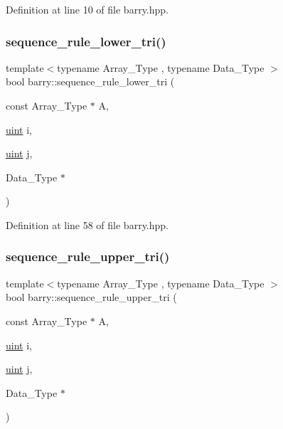 Definition at line 10 of file barry.\+hpp.

\mbox{\label{namespacebarry_a2889c6210e2711e33c34ca9c8b5de7d9}} 
\subsubsection{\texorpdfstring{sequence\+\_\+rule\+\_\+lower\+\_\+tri()}{sequence\_rule\_lower\_tri()}}
{\footnotesize\ttfamily template$<$typename Array\+\_\+\+Type , typename Data\+\_\+\+Type $>$ \\
bool barry\+::sequence\+\_\+rule\+\_\+lower\+\_\+tri (\begin{DoxyParamCaption}\item[{const Array\+\_\+\+Type $\ast$}]{A,  }\item[{\hyperlink{namespacebarry_a11dfc53ddb4672278319aa04f1e09a6c}{uint}}]{i,  }\item[{\hyperlink{namespacebarry_a11dfc53ddb4672278319aa04f1e09a6c}{uint}}]{j,  }\item[{Data\+\_\+\+Type $\ast$}]{ }\end{DoxyParamCaption})\hspace{0.3cm}{\ttfamily [inline]}}



Definition at line 58 of file barry.\+hpp.

\mbox{\label{namespacebarry_a1433970b34e5904f846a0aa41abef448}} 
\subsubsection{\texorpdfstring{sequence\+\_\+rule\+\_\+upper\+\_\+tri()}{sequence\_rule\_upper\_tri()}}
{\footnotesize\ttfamily template$<$typename Array\+\_\+\+Type , typename Data\+\_\+\+Type $>$ \\
bool barry\+::sequence\+\_\+rule\+\_\+upper\+\_\+tri (\begin{DoxyParamCaption}\item[{const Array\+\_\+\+Type $\ast$}]{A,  }\item[{\hyperlink{namespacebarry_a11dfc53ddb4672278319aa04f1e09a6c}{uint}}]{i,  }\item[{\hyperlink{namespacebarry_a11dfc53ddb4672278319aa04f1e09a6c}{uint}}]{j,  }\item[{Data\+\_\+\+Type $\ast$}]{ }\end{DoxyParamCaption})\hspace{0.3cm}{\ttfamily [inline]}}



